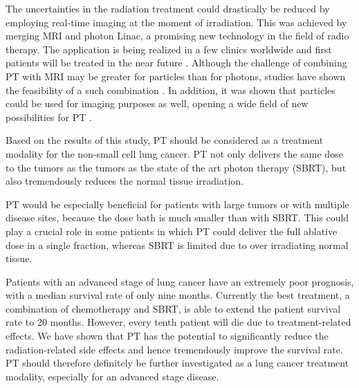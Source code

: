 \vspace{5mm}

The uncertainties in the radiation treatment could drastically be reduced by employing real-time imaging at the moment of irradiation.
This was achieved by merging MRI and photon Linac, a promising new technology in the field of radio therapy. The application is being realized in a few clinics
worldwide and first patients will be treated in the near future \cite{Lagendijk2016}.
Although the challenge of combining PT with MRI may be greater for particles than for photons, studies have shown the feasibility of a such combination \cite{Hartman2015}.
In addition, it was shown that particles could be used for imaging purposes as well, opening a wide
field of new possibilities for PT \cite{Prall2016}.

\newpage

Based on the results of this study, PT should be considered as a treatment modality for the non-small cell lung cancer. PT not only delivers the same dose to the
tumors as the tumors as the state of the art photon therapy (SBRT), but also tremendously reduces the normal tissue irradiation.

\vspace{5mm}

PT would be especially beneficial for patients with large tumors or with multiple disease sites, because the dose bath is much
smaller than with SBRT. This could play a crucial role in some patients in which PT could deliver the full ablative dose in a single fraction, whereas SBRT is limited due to over 
irradiating normal tissue.

\vspace{5mm}

Patients with an advanced stage of lung cancer have an extremely poor prognosis, with a median survival rate of only nine months. 
Currently the best treatment, a combination of chemotherapy and SBRT, is able to extend the patient survival rate to 20 months. 
However, every tenth patient will die due to treatment-related effects. We have shown that PT has the potential to 
significantly reduce the radiation-related side effects and hence tremendously improve the survival rate.
PT should therefore definitely be further investigated as a lung cancer treatment modality, especially for an advanced stage disease.

